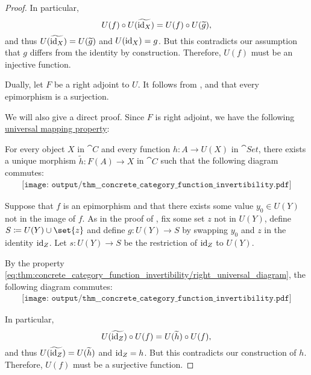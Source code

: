 \begin{proof}
  In particular,
  \begin{equation*}
    U(f) \bincirc U(\widetilde{\id_X}) = U(f) \bincirc U(\widetilde{g}),
  \end{equation*}
  and thus \( U(\widetilde{\operatorname{id}_X}) = U(\widetilde{g}) \) and \( U(\operatorname{id}_X) = g \). But this contradicts our assumption that \( g \) differs from the identity by construction. Therefore, \( U(f) \) must be an injective function.

   Dually, let \( F \) be a right adjoint to \( U \). It follows from ,  and  that every epimorphism is a surjection.

  We will also give a direct proof. Since \( F \) is right adjoint, we have the following \hyperref[rem:universal_mapping_property]{universal mapping property}:
  \begin{displayquote}
    For every object \( X \) in \( \cat{C} \) and every function \( h: A \to U(X) \) in \( \cat{Set} \), there exists a unique morphism \( \widetilde{h}: F(A) \to X \) in \( \cat{C} \) such that the following diagram commutes:
    \begin{equation}\label{eq:thm:concrete_category_function_invertibility/right_universal_diagram}
      \begin{aligned}
        \texttt{[image: output/thm\_\_concrete\_category\_function\_invertibility.pdf]}
      \end{aligned}
    \end{equation}
  \end{displayquote}

  Suppose that \( f \) is an epimorphism and that there exists some value \( y_0 \in U(Y) \) not in the image of \( f \). As in the proof of , fix some set \( z \) not in \( U(Y) \), define \( S \coloneqq U(Y) \cup \set{ z } \) and define \( g: U(Y) \to S \) by swapping \( y_0 \) and \( z \) in the identity \( \operatorname{id}_Z \). Let \( s: U(Y) \to S \) be the restriction of \( \operatorname{id}_Z \) to \( U(Y) \).

  By the property \eqref{eq:thm:concrete_category_function_invertibility/right_universal_diagram}, the following diagram commutes:
  \begin{equation}\label{eq:thm:concrete_category_function_invertibility/right_diagram}
    \begin{aligned}
      \texttt{[image: output/thm\_\_concrete\_category\_function\_invertibility.pdf]}
    \end{aligned}
  \end{equation}

  In particular,
  \begin{equation*}
  U(\widetilde{\id_Z}) \bincirc U(f) = U(\widetilde{h}) \bincirc U(f),
  \end{equation*}
  and thus \( U(\widetilde{\operatorname{id}_Z}) = U(\widetilde{h}) \) and \( \operatorname{id}_Z = h \). But this contradicts our construction of \( h \). Therefore, \( U(f) \) must be a surjective function.
\end{proof}
